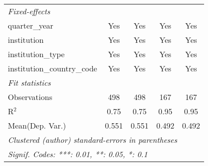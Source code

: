 \begin{tabular}{lcccc}
   \emph{Fixed-effects}\\
   quarter\_year                         & Yes     & Yes          & Yes             & Yes\\  
   institution                           & Yes     & Yes          & Yes             & Yes\\  
   institution\_type                     & Yes     & Yes          & Yes             & Yes\\  
   institution\_country\_code            & Yes     & Yes          & Yes             & Yes\\  
   \midrule
   \emph{Fit statistics}\\
   Observations                          & 498     & 498          & 167             & 167\\  
   R$^2$                                 & 0.75    & 0.75         & 0.95            & 0.95\\  
Mean(Dep. Var.) & 0.551 & 0.551 & 0.492 & 0.492 \\
   \midrule \midrule
   \multicolumn{5}{l}{\emph{Clustered (author) standard-errors in parentheses}}\\
   \multicolumn{5}{l}{\emph{Signif. Codes: ***: 0.01, **: 0.05, *: 0.1}}\\
\end{tabular}
\par\endgroup
